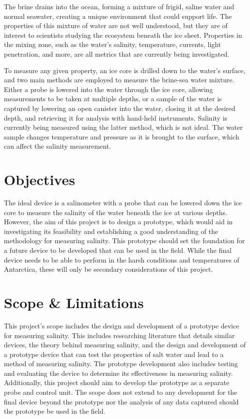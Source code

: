The brine drains into the ocean, forming a mixture of frigid, saline water and normal seawater, creating a unique environment that could support life.
The properties of this mixture of water are not well understood, but they are of interest to scientists studying the ecosystem beneath the ice sheet.
Properties in the mixing zone, such as the water's salinity, temperature, currents, light penetration, and more, are all metrics that are currently being investigated.

To measure any given property, an ice core is drilled down to the water's surface, and two main methods are employed to measure the brine-sea water mixture.
Either a probe is lowered into the water through the ice core, allowing measurements to be taken at multiple depths, or a sample of the water is captured by lowering an open canister into the water, closing it at the desired depth, and retrieving it for analysis with hand-held instruments.
Salinity is currently being measured using the latter method, which is not ideal. 
The water sample changes temperature and pressure as it is brought to the surface, which can affect the salinity measurement.

\section{Objectives}
The ideal device is a salinometer with a probe that can be lowered down the ice core to measure the salinity of the water beneath the ice at various depths.
However, the aim of this project is to design a prototype, which would aid in investigating its feasibility and establishing a good understanding of the methodology for measuring salinity.
This prototype should set the foundation for a future device to be developed that can be used in the field.
While the final device needs to be able to perform in the harsh conditions and temperatures of Antarctica, these will only be secondary considerations of this project.


\section{Scope \& Limitations}
This project's scope includes the design and development of a prototype device for measuring salinity.
This includes researching literature that details similar devices, the theory behind measuring salinity, and the design and development of a prototype device that can test the properties of salt water and lead to a method of measuring salinity.
The prototype development also includes testing and evaluating the device to determine its effectiveness in measuring salinity.
Additionally, this project should aim to develop the prototype as a separate probe and control unit.
The scope does not extend to any development for the final device beyond the prototype nor the analysis of any data captured should the prototype be used in the field.

